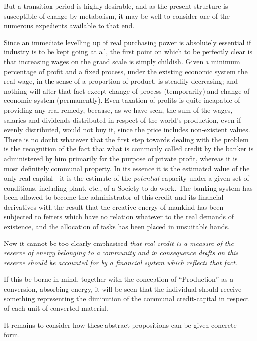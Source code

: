 \documentclass{book}
\begin{document}
But a transition period is highly desirable, and as the present structure is susceptible of change by metabolism, it may be well to consider one of the numerous expedients available to that end.

Since an immediate levelling up of real purchasing power is absolutely essential if industry is to be kept going at all, the first point on which to be perfectly clear is that increasing wages on the grand scale is simply childish. Given a minimum percentage of profit and a fixed process, under the existing economic system the real wage, in the sense of a proportion of product, is steadily decreasing; and nothing will alter that fact except change of process (temporarily) and change of economic system (permanently). Even taxation of profits is quite incapable of providing any real remedy, because, as we have seen, the sum of the wages, salaries and dividends distributed in respect of the world’s production, even if evenly distributed, would not buy it, since the price includes non-existent values. There is no doubt whatever that the first step towards dealing with the problem is the recognition of the fact that what is commonly called credit by the banker is administered by him primarily for the purpose of private profit, whereas it is most definitely communal property. In its essence it is the estimated value of the only real capital—it is the estimate of the \emph{potential} capacity under a given set of conditions, including plant, etc., of a Society to do work. The banking system has been allowed to become the administrator of this credit and its financial derivatives with the result that the creative energy of mankind has been subjected to fetters which have no relation whatever to the real demands of existence, and the allocation of tasks has been placed in unsuitable hands.

Now it cannot be too clearly emphasised \emph{that real credit is a measure of the reserve of energy belonging to a community and in consequence drafts on this reserve should he accounted for by a financial system which reflects that fact}.

If this be borne in mind, together with the conception of “Production” as a conversion, absorbing energy, it will be seen that the individual should receive something representing the diminution of the communal credit-capital in respect of each unit of converted material.

It remains to consider how these abstract propositions can be given concrete form.
\end{document}
